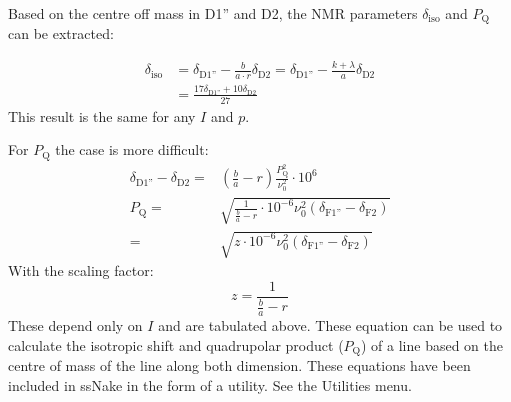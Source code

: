 \documentclass[11pt,a4paper]{article}
\begin{document}
 Based on the centre off mass in D1'' and D2, the NMR parameters $\delta_\text{iso}$ and $P_\text{Q}$
 can be extracted:

 \begin{align}
	\delta_\text{iso} & = \delta_\text{D1''} - \frac{b}{a\cdot r} \delta_\text{D2} =
	\delta_\text{D1''} - \frac{k+\lambda}{a} \delta_\text{D2} \\
	& = \frac{17 \delta_\text{D1''} + 10  \delta_\text{D2}}{27}
 \end{align}
 This result is the same for any $I$ and $p$.

 For $P_\text{Q}$ the case is more difficult:
 \begin{align}
	\delta_\text{D1''} - \delta_\text{D2} =& \left( \frac{b}{a} - r \right)
	\frac{P_\text{Q}^2}{\nu_0^2} \cdot 10^6\\ 
	P_\text{Q} =& \sqrt{  \frac{1}{\frac{b}{a}-r}\cdot 10^{-6} \nu_0^2 (\delta_\text{F1''} -
	\delta_\text{F2}) } \\
	=& \sqrt{  z \cdot 10^{-6} \nu_0^2 (\delta_\text{F1''} -
	\delta_\text{F2}) } 
  \end{align}
  With the scaling factor:
  \begin{equation}
	 z = \frac{1}{\frac{b}{a}-r}
  \end{equation}
  These depend only on $I$ and are tabulated above. These equation can be used to calculate the
  isotropic shift and quadrupolar product ($P_\text{Q}$) of a line based on the centre of mass of
  the line along both dimension. These equations have been included in ssNake in the form of a
  utility. See the Utilities menu.
\end{document}

